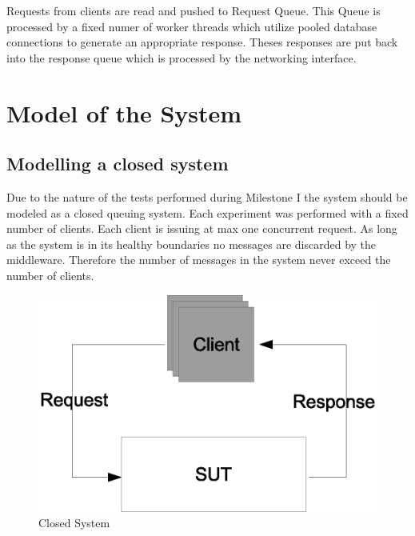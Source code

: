 \documentclass[a4paper]{article}
\begin{document}
Requests from clients are read and pushed to Request Queue. This Queue is processed by a fixed numer of worker threads which utilize pooled database connections to generate an appropriate response. Theses responses are put back into the response queue which is processed by the networking interface.


\section{Model of the System}
\label{sec:SystemModel}

\subsection{Modelling a closed system}
Due to the nature of the tests performed during Milestone I the system should be modeled as a closed queuing system. Each experiment was performed with a fixed number of clients. Each client is issuing at max one concurrent request. As long as the system is in its healthy boundaries no messages are discarded by the middleware. Therefore the number of messages in the system never exceed the number of clients.



\begin{figure}[H]
	\begin{center}
    \includegraphics[scale=0.4]{../drawings-ms2/sut.eps}
  \end{center}
  \caption{Closed System}
  \label{fig:closedsystem}
\end{figure}
\end{document}

